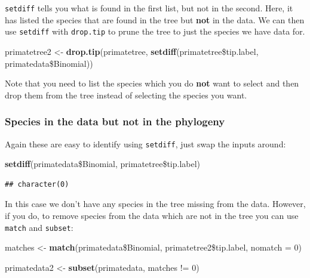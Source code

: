 \documentclass[12pt]{article}
\newcommand{\KeywordTok}[1]{\textcolor[rgb]{0.13,0.29,0.53}{\textbf{{#1}}}}
\newcommand{\DataTypeTok}[1]{\textcolor[rgb]{0.13,0.29,0.53}{{#1}}}
\newcommand{\DecValTok}[1]{\textcolor[rgb]{0.00,0.00,0.81}{{#1}}}
\newcommand{\StringTok}[1]{\textcolor[rgb]{0.31,0.60,0.02}{{#1}}}
\newcommand{\NormalTok}[1]{{#1}}
\begin{document}
\texttt{setdiff} tells you what is found in the first list, but not in the second. Here, it has listed the species that are found in the tree but \textbf{not} in the data. We can then use \texttt{setdiff} with \texttt{drop.tip} to prune the tree to just the species we have data for. 

\begin{snugshade}
\begin{Highlighting}[]
\NormalTok{primatetree2 <-}\StringTok{ }\KeywordTok{drop.tip}\NormalTok{(primatetree, }\KeywordTok{setdiff}\NormalTok{(primatetree\$tip.label, }
                          \NormalTok{primatedata\$Binomial))}
\end{Highlighting}
\end{snugshade}

Note that you need to list the species which you do \textbf{not} want to select and then drop them from the tree instead of selecting the species you want.

\subsubsection{Species in the data but not in the phylogeny}
Again these are easy to identify using \texttt{setdiff}, just swap the inputs around:

\begin{snugshade}
\begin{Highlighting}[]
\KeywordTok{setdiff}\NormalTok{(primatedata\$Binomial, primatetree\$tip.label)}
\end{Highlighting}
\end{snugshade}

\begin{verbatim}
## character(0)
\end{verbatim}

In this case we don't have any species in the tree missing from the data. However, if you do, to remove species from the data which are not in the tree you can use \texttt{match} and \texttt{subset}:

\begin{snugshade}
\begin{Highlighting}[]
\NormalTok{matches <-}\StringTok{ }\KeywordTok{match}\NormalTok{(primatedata\$Binomial, primatetree2\$tip.label, }\DataTypeTok{nomatch =} \DecValTok{0}\NormalTok{)}

\NormalTok{primatedata2 <-}\StringTok{ }\KeywordTok{subset}\NormalTok{(primatedata, matches !=}\StringTok{ }\DecValTok{0}\NormalTok{)}
\end{Highlighting}
\end{snugshade}
\end{document}
